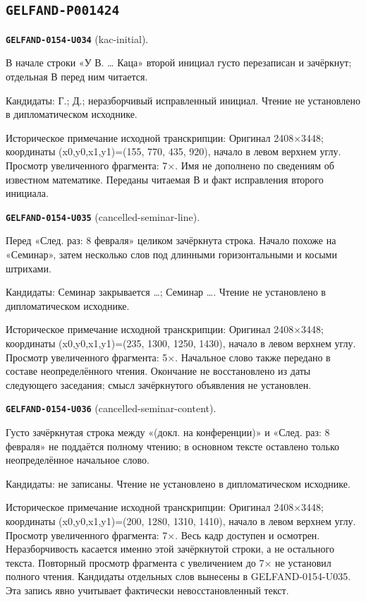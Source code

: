 \subsection*{\texttt{GELFAND-P001424}}
\par\noindent\leavevmode{}\label{GELFAND-0154-U034}\textbf{\texttt{GELFAND-0154-U034}} (kac-initial).\nopagebreak[4]\par
В начале строки «У В. … Каца» второй инициал густо перезаписан и зачёркнут; отдельная В перед ним читается.\par
Кандидаты: Г.; Д.; неразборчивый исправленный инициал. Чтение не установлено в дипломатическом исходнике.\par
Историческое примечание исходной транскрипции: Оригинал 2408×3448; координаты (x0,y0,x1,y1)=(155, 770, 435, 920), начало в левом верхнем углу. Просмотр увеличенного фрагмента: 7×. Имя не дополнено по сведениям об известном математике. Переданы читаемая В и факт исправления второго инициала.\par\medskip
\par\noindent\leavevmode{}\label{GELFAND-0154-U035}\textbf{\texttt{GELFAND-0154-U035}} (cancelled-seminar-line).\nopagebreak[4]\par
Перед «След. раз: 8 февраля» целиком зачёркнута строка. Начало похоже на «Семинар», затем несколько слов под длинными горизонтальными и косыми штрихами.\par
Кандидаты: Семинар закрывается …; Семинар …. Чтение не установлено в дипломатическом исходнике.\par
Историческое примечание исходной транскрипции: Оригинал 2408×3448; координаты (x0,y0,x1,y1)=(235, 1300, 1250, 1430), начало в левом верхнем углу. Просмотр увеличенного фрагмента: 5×. Начальное слово также передано в составе неопределённого чтения. Окончание не восстановлено из даты следующего заседания; смысл зачёркнутого объявления не установлен.\par\medskip
\par\noindent\leavevmode{}\label{GELFAND-0154-U036}\textbf{\texttt{GELFAND-0154-U036}} (cancelled-seminar-content).\nopagebreak[4]\par
Густо зачёркнутая строка между «(докл. на конференции)» и «След. раз: 8 февраля» не поддаётся полному чтению; в основном тексте оставлено только неопределённое начальное слово.\par
Кандидаты: не записаны. Чтение не установлено в дипломатическом исходнике.\par
Историческое примечание исходной транскрипции: Оригинал 2408×3448; координаты (x0,y0,x1,y1)=(200, 1280, 1310, 1410), начало в левом верхнем углу. Просмотр увеличенного фрагмента: 7×. Весь кадр доступен и осмотрен. Неразборчивость касается именно этой зачёркнутой строки, а не остального текста. Повторный просмотр фрагмента с увеличением до 7× не установил полного чтения. Кандидаты отдельных слов вынесены в GELFAND-0154-U035. Эта запись явно учитывает фактически невосстановленный текст.\par\medskip
